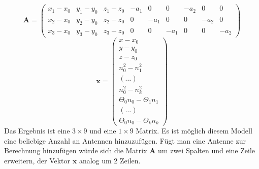 {%
\begin{equation}
\mathbf{A}=
\left(
	\begin{array}{ccccccccc}
		x_1-x_0 & y_1-y_0 & z_1-z_0 & -a_1 & 0 & 0 & -a_2 & 0 & 0 \\
		x_2-x_0 & y_2-y_0 & z_2-z_0 & 0 & -a_1 & 0 & 0 & -a_2 & 0 \\
		x_3-x_0 & y_3-y_0 & z_3-z_0 & 0 & 0 & -a_1 & 0 & 0 & -a_2
	\end{array}
\right)
\end{equation}
%
\begin{equation}
\mathbf{x}=
\left(
	\begin{array}{c}
		x-x_0	\\
		y-y_0	\\
		z-z_0	\\
		n_0^2-n_1^2	\\
		(\dots)	\\
		n_0^2-n_k^2	\\
		\Theta_0n_0-\Theta_1n_1	\\
		(\dots)	\\
		\Theta_0n_0-\Theta_kn_k	
	\end{array}
\right)
\end{equation}
Das Ergebnis ist eine $3\times9$ und eine $1\times9$ Matrix. Es ist möglich diesem Modell eine beliebige Anzahl an Antennen hinzuzufügen. Fügt man eine Antenne zur Berechnung hinzufügen würde sich die Matrix $\mathbf{A}$ um zwei Spalten und eine Zeile erweitern, der Vektor $\mathbf{x}$ analog um 2 Zeilen.

}